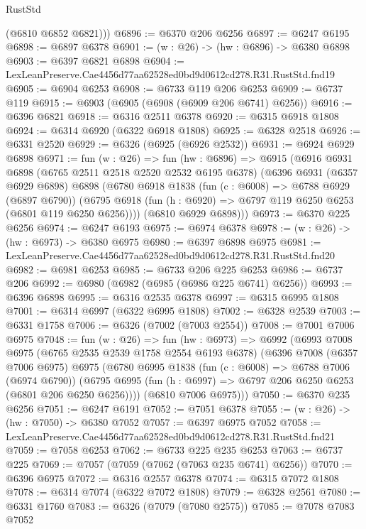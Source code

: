 \begin{lexlean}{RustStd}
\begin{coremodule}
        (@6810 @6852 @6821)))
@6896 := @6370 @206 @6256
@6897 := @6247 @6195
@6898 := @6897 @6378
@6901 := (w : @26) -> (hw : @6896) -> @6380 @6898
@6903 := @6397 @6821 @6898
@6904 := LexLeanPreserve.Cae4456d77aa62528ed0bd9d0612cd278.R31.RustStd.fnd19
@6905 := @6904 @6253
@6908 := @6733 @119 @206 @6253
@6909 := @6737 @119
@6915 := @6903 (@6905 (@6908 (@6909 @206 @6741) @6256))
@6916 := @6396 @6821
@6918 := @6316 @2511 @6378
@6920 := @6315 @6918 @1808
@6924 := @6314 @6920 (@6322 @6918 @1808)
@6925 := @6328 @2518
@6926 := @6331 @2520
@6929 := @6326 (@6925 (@6926 @2532))
@6931 := @6924 @6929 @6898
@6971 := fun (w : @26) =>
  fun (hw : @6896) =>
  @6915
    (@6916
      @6931
      @6898
      (@6765 @2511 @2518 @2520 @2532 @6195 @6378)
      (@6396
        @6931
        (@6357 @6929 @6898)
        @6898
        (@6780
          @6918
          @1838
          (fun (c : @6008) => @6788 @6929 (@6897 @6790))
          (@6795 @6918 (fun (h : @6920) => @6797 @119 @6250 @6253 (@6801 @119 @6250 @6256))))
        (@6810 @6929 @6898)))
@6973 := @6370 @225 @6256
@6974 := @6247 @6193
@6975 := @6974 @6378
@6978 := (w : @26) -> (hw : @6973) -> @6380 @6975
@6980 := @6397 @6898 @6975
@6981 := LexLeanPreserve.Cae4456d77aa62528ed0bd9d0612cd278.R31.RustStd.fnd20
@6982 := @6981 @6253
@6985 := @6733 @206 @225 @6253
@6986 := @6737 @206
@6992 := @6980 (@6982 (@6985 (@6986 @225 @6741) @6256))
@6993 := @6396 @6898
@6995 := @6316 @2535 @6378
@6997 := @6315 @6995 @1808
@7001 := @6314 @6997 (@6322 @6995 @1808)
@7002 := @6328 @2539
@7003 := @6331 @1758
@7006 := @6326 (@7002 (@7003 @2554))
@7008 := @7001 @7006 @6975
@7048 := fun (w : @26) =>
  fun (hw : @6973) =>
  @6992
    (@6993
      @7008
      @6975
      (@6765 @2535 @2539 @1758 @2554 @6193 @6378)
      (@6396
        @7008
        (@6357 @7006 @6975)
        @6975
        (@6780
          @6995
          @1838
          (fun (c : @6008) => @6788 @7006 (@6974 @6790))
          (@6795 @6995 (fun (h : @6997) => @6797 @206 @6250 @6253 (@6801 @206 @6250 @6256))))
        (@6810 @7006 @6975)))
@7050 := @6370 @235 @6256
@7051 := @6247 @6191
@7052 := @7051 @6378
@7055 := (w : @26) -> (hw : @7050) -> @6380 @7052
@7057 := @6397 @6975 @7052
@7058 := LexLeanPreserve.Cae4456d77aa62528ed0bd9d0612cd278.R31.RustStd.fnd21
@7059 := @7058 @6253
@7062 := @6733 @225 @235 @6253
@7063 := @6737 @225
@7069 := @7057 (@7059 (@7062 (@7063 @235 @6741) @6256))
@7070 := @6396 @6975
@7072 := @6316 @2557 @6378
@7074 := @6315 @7072 @1808
@7078 := @6314 @7074 (@6322 @7072 @1808)
@7079 := @6328 @2561
@7080 := @6331 @1760
@7083 := @6326 (@7079 (@7080 @2575))
@7085 := @7078 @7083 @7052

\end{coremodule}
\end{lexlean}
